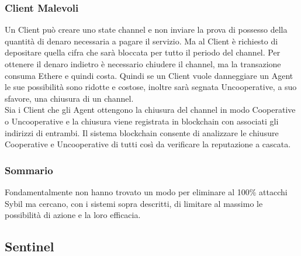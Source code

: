 \documentclass[]{article}
\begin{document}
	\subsubsection{Client Malevoli}	
	Un Client può creare uno state channel e non inviare la prova di possesso della quantità di denaro necessaria a pagare il servizio. Ma al Client è richiesto di depositare quella cifra che sarà bloccata per tutto il periodo del channel. Per ottenere il denaro indietro è necessario chiudere il channel, ma la transazione consuma Ethere e quindi costa.
	Quindi se un Client vuole danneggiare un Agent le sue possibilità sono ridotte e costose, inoltre sarà segnata Uncooperative, a suo sfavore, una chiusura di un channel.\\	
	Sia i Client che gli Agent ottengono la chiusura del channel in modo Cooperative o Uncooperative e la chiusura viene registrata in blockchain con associati gli indirizzi di entrambi.
	Il sistema blockchain consente di analizzare le chiusure Cooperative e Uncooperative di tutti così da verificare la reputazione a cascata.	
	\subsubsection{Sommario}	
	Fondamentalmente non hanno trovato un modo per eliminare al 100\% attacchi Sybil ma cercano, con i sistemi sopra descritti, di limitare al massimo le possibilità di azione e la loro efficacia.
	
	
	
	
	
	
	\subsection{Sentinel}
	
\end{document}
